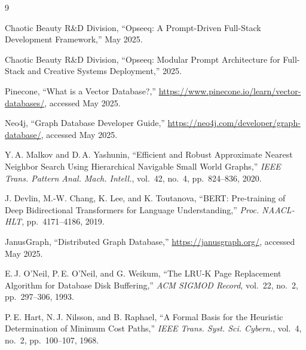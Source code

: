 \documentclass[11pt]{article}
\begin{document}
\begin{thebibliography}{9}

Chaotic Beauty R\&D Division,  
``Opseeq: A Prompt-Driven Full-Stack Development Framework,''  
May 2025.

Chaotic Beauty R\&D Division,  
``Opseeq: Modular Prompt Architecture for Full-Stack and Creative Systems Deployment,''  
2025.

Pinecone,  
``What is a Vector Database?,''  
\url{https://www.pinecone.io/learn/vector-databases/}, accessed May 2025.

Neo4j,  
``Graph Database Developer Guide,''  
\url{https://neo4j.com/developer/graph-database/}, accessed May 2025.

Y.\,A. Malkov and D.\,A. Yashunin,  
``Efficient and Robust Approximate Nearest Neighbor Search Using Hierarchical Navigable Small World Graphs,''  
\emph{IEEE Trans. Pattern Anal. Mach. Intell.}, vol.~42, no.~4, pp.~824–836, 2020.

J. Devlin, M.-W. Chang, K. Lee, and K. Toutanova,  
``BERT: Pre-training of Deep Bidirectional Transformers for Language Understanding,''  
\emph{Proc. NAACL-HLT}, pp.~4171–4186, 2019.

JanusGraph,  
``Distributed Graph Database,''  
\url{https://janusgraph.org/}, accessed May 2025.

E.\,J. O’Neil, P.\,E. O’Neil, and G. Weikum,  
``The LRU-K Page Replacement Algorithm for Database Disk Buffering,''  
\emph{ACM SIGMOD Record}, vol.~22, no.~2, pp.~297–306, 1993.

P.\,E. Hart, N.\,J. Nilsson, and B. Raphael,  
``A Formal Basis for the Heuristic Determination of Minimum Cost Paths,''  
\emph{IEEE Trans. Syst. Sci. Cybern.}, vol.~4, no.~2, pp.~100–107, 1968.

\end{thebibliography}
\end{document}
